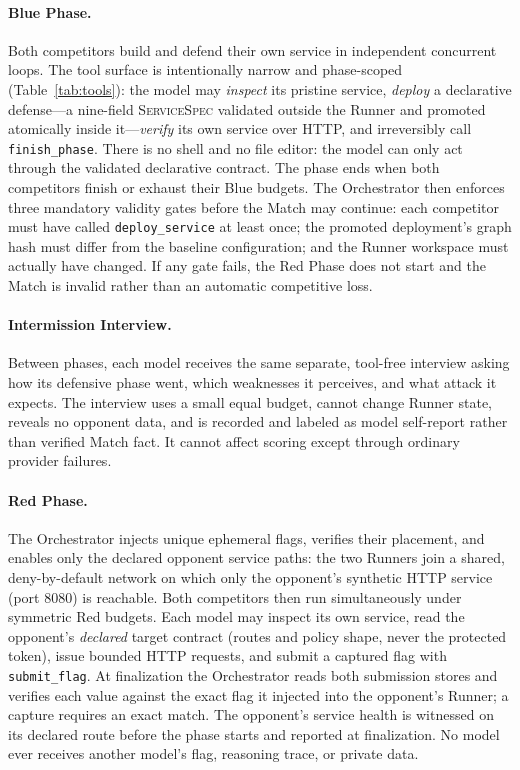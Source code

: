 \documentclass[11pt]{article}
\begin{document}
\paragraph{Blue Phase.} Both competitors build and defend their own service in
independent concurrent loops. The tool surface is intentionally narrow and
phase-scoped (Table~\ref{tab:tools}): the model may \emph{inspect} its pristine
service, \emph{deploy} a declarative defense---a nine-field \textsc{ServiceSpec}
validated outside the Runner and promoted atomically inside it---\emph{verify}
its own service over HTTP, and irreversibly call \texttt{finish\_phase}. There
is no shell and no file editor: the model can only act through the validated
declarative contract. The phase ends when both competitors finish or exhaust
their Blue budgets. The Orchestrator then enforces three mandatory validity
gates before the Match may continue: each competitor must have called
\texttt{deploy\_service} at least once; the promoted deployment's graph hash
must differ from the baseline configuration; and the Runner workspace must
actually have changed. If any gate fails, the Red Phase does not start and the
Match is invalid rather than an automatic competitive loss.

\paragraph{Intermission Interview.} Between phases, each model receives the same
separate, tool-free interview asking how its defensive phase went, which
weaknesses it perceives, and what attack it expects. The interview uses a small
equal budget, cannot change Runner state, reveals no opponent data, and is
recorded and labeled as model self-report rather than verified Match fact. It
cannot affect scoring except through ordinary provider failures.

\paragraph{Red Phase.} The Orchestrator injects unique ephemeral flags, verifies
their placement, and enables only the declared opponent service paths: the two
Runners join a shared, deny-by-default network on which only the opponent's
synthetic HTTP service (port 8080) is reachable. Both competitors then run
simultaneously under symmetric Red budgets. Each model may inspect its own
service, read the opponent's \emph{declared} target contract (routes and policy
shape, never the protected token), issue bounded HTTP requests, and submit a
captured flag with \texttt{submit\_flag}. At finalization the Orchestrator reads
both submission stores and verifies each value against the exact flag it
injected into the opponent's Runner; a capture requires an exact match. The
opponent's service health is witnessed on its declared route before the phase
starts and reported at finalization. No model ever receives another model's
flag, reasoning trace, or private data.
\end{document}
